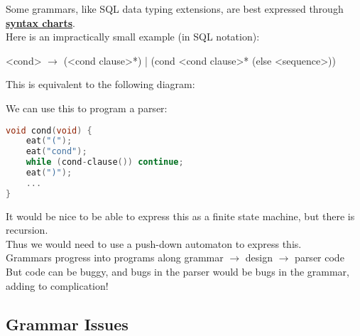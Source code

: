 \documentclass[../../lecture_notes.tex]{subfiles}
\begin{document}
\noindent Some grammars, like SQL data typing extensions, 
	are best expressed through \textbf{\underline{syntax charts}}.\\
Here is an impractically small example (in SQL notation):\begin{center}
	<cond> $\rightarrow$ (<cond clause>*) | (cond <cond clause>* (else <sequence>)) \end{center}
This is equivalent to the following diagram: \begin{center}  \end{center}
We can use this to program a parser: \begin{lstlisting}[language=C]
void cond(void) {
	eat("(");
	eat("cond");
	while (cond-clause()) continue;
	eat(")");
	...
} \end{lstlisting}
It would be nice to be able to express this as a finite state machine, but there is recursion.\\
Thus we would need to use a push-down automaton to express this.\\
Grammars progress into programs along grammar $\rightarrow$ design $\rightarrow$ parser code\\
But code can be buggy, and bugs in the parser would be bugs in the grammar, adding to complication!

\subsection*{Grammar Issues}
\end{document}
